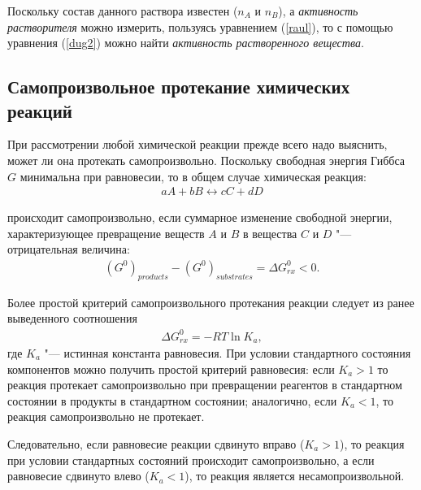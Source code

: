\documentclass[12pt,a4paper,oneside]{book}
\begin{document}
Поскольку состав данного раствора известен ($n_A$ и $n_B$), а \textit{активность растворителя} можно измерить, пользуясь уравнением (\ref{raul}), то с помощью уравнения  (\ref{dug2}) можно найти \textit{активность растворенного вещества}. 

\subsection{Самопроизвольное протекание химических реакций}

При рассмотрении любой химической реакции прежде всего надо выяснить, может ли она протекать самопроизвольно. Поскольку свободная энергия Гиббса $G$ минимальна при равновесии, то в общем случае химическая реакция:
\begin{align}
	aA + bB \leftrightarrow cC + dD
\end{align}

происходит самопроизвольно, если суммарное изменение свободной энергии, характеризующее превращение веществ $A$ и $B$ в вещества $C$ и $D$ "--- отрицательная величина:   
\begin{align}
(G^0)_{products} - (G^0)_{substrates} = \Delta G_{rx}^0 < 0 .
\end{align}

Более простой критерий самопроизвольного протекания реакции следует из ранее выведенного соотношения
\begin{align}
\Delta G_{rx}^0 = -RT \ln K_a ,
\end{align}
где $K_a$ "--- истинная константа равновесия. При условии стандартного состояния компонентов можно получить простой критерий равновесия: если $K_a > 1$ то реакция протекает самопроизвольно при превращении реагентов в стандартном состоянии в продукты в стандартном состоянии; аналогично, если $K_a < 1$, то реакция самопроизвольно не протекает.

Следовательно, если равновесие реакции сдвинуто вправо ($ K_a > 1 $), то реакция при условии стандартных состояний происходит самопроизвольно, а если равновесие сдвинуто влево ($ K_a<1 $), то реакция является несамопроизвольной.
\end{document}
